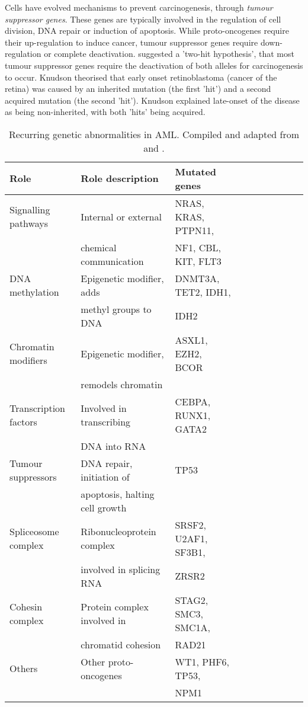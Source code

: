 Cells have evolved mechanisms to prevent carcinogenesis, through \textit{tumour suppressor genes}. These genes are typically involved in the regulation of cell division, DNA repair or induction of apoptosis. While proto-oncogenes require their up-regulation to induce cancer, tumour suppressor genes require down-regulation or complete deactivation. \cite{knudson1971mutation} suggested a 'two-hit hypothesis', that most tumour suppressor genes require the deactivation of both alleles for carcinogenesis to occur. Knudson theorised that early onset retinoblastoma (cancer of the retina) was caused by an inherited mutation (the first 'hit') and a second acquired mutation (the second 'hit'). Knudson explained late-onset of the disease as being non-inherited, with both 'hits' being acquired. 

\clearpage
\begin{table}[H]
    \centering
    \caption{Recurring genetic abnormalities in \ac{AML}. Compiled and adapted from \cite{dinardo2016mutations} and \cite{lindsley2015acute}.}
	\label{tab:genetic abnormalities}
    \begin{tabular}{llllllllll}
    \toprule
\textbf{Role} & \textbf{Role description} & \textbf{Mutated genes} &  &  \\ \midrule
Signalling pathways & Internal or external & NRAS, KRAS, PTPN11, &  &  \\
 & chemical communication & NF1, CBL, KIT, FLT3 &  &  \\ \hline
DNA methylation & Epigenetic modifier, adds & DNMT3A, TET2, IDH1, &  &  \\
 & methyl groups to DNA & IDH2 &  &  \\ \hline
Chromatin modifiers & Epigenetic modifier, & ASXL1, EZH2, BCOR &  &  \\
 & remodels chromatin &  &  &  \\ \hline
Transcription factors & Involved in transcribing & CEBPA, RUNX1, GATA2 &  &  \\
 & DNA into RNA &  &  &  \\ \hline
Tumour suppressors & DNA repair, initiation of & TP53 &  &  \\
 & apoptosis, halting cell growth &  &  &  \\ \hline
Spliceosome complex & Ribonucleoprotein complex & SRSF2, U2AF1, SF3B1, &  &  \\
 & involved in splicing RNA & ZRSR2 &  &  \\ \hline
Cohesin complex & Protein complex involved in & STAG2, SMC3, SMC1A, &  &  \\
 & chromatid cohesion & RAD21 &  &  \\ \hline
Others & Other proto-oncogenes & WT1, PHF6, TP53, &  &  \\
 &  & NPM1 &  &  \\ \bottomrule
    \end{tabular}
\end{table}

